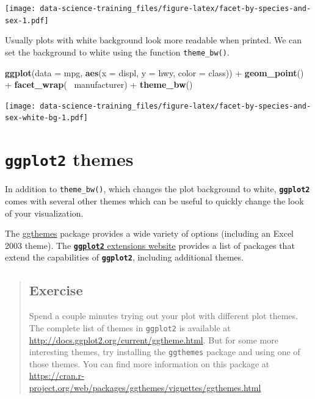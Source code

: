 \documentclass[]{book}
\newenvironment{Shaded}{\begin{snugshade}}{\end{snugshade}}
\newcommand{\KeywordTok}[1]{\textcolor[rgb]{0.13,0.29,0.53}{\textbf{{#1}}}}
\newcommand{\DataTypeTok}[1]{\textcolor[rgb]{0.13,0.29,0.53}{{#1}}}
\newcommand{\StringTok}[1]{\textcolor[rgb]{0.31,0.60,0.02}{{#1}}}
\newcommand{\NormalTok}[1]{{#1}}
\theoremstyle{definition}
\theoremstyle{definition}
\theoremstyle{definition}
\theoremstyle{remark}
\begin{document}
\texttt{[image: data-science-training\_files/figure-latex/facet-by-species-and-sex-1.pdf]}

Usually plots with white background look more readable when printed. We
can set the background to white using the function \texttt{theme\_bw()}.

\begin{Shaded}
\begin{Highlighting}[]
 \KeywordTok{ggplot}\NormalTok{(}\DataTypeTok{data =} \NormalTok{mpg, }\KeywordTok{aes}\NormalTok{(}\DataTypeTok{x =} \NormalTok{displ, }\DataTypeTok{y =} \NormalTok{hwy, }\DataTypeTok{color =} \NormalTok{class)) +}
\StringTok{     }\KeywordTok{geom_point}\NormalTok{() +}
\StringTok{     }\KeywordTok{facet_wrap}\NormalTok{(~}\StringTok{ }\NormalTok{manufacturer) +}
\StringTok{     }\KeywordTok{theme_bw}\NormalTok{()}
\end{Highlighting}
\end{Shaded}

\texttt{[image: data-science-training\_files/figure-latex/facet-by-species-and-sex-white-bg-1.pdf]}

\section{\texorpdfstring{\textbf{\texttt{ggplot2}}
themes}{ggplot2 themes}}\label{ggplot2-themes}

In addition to \texttt{theme\_bw()}, which changes the plot background
to white, \textbf{\texttt{ggplot2}} comes with several other themes
which can be useful to quickly change the look of your visualization.

The
\href{https://cran.r-project.org/web/packages/ggthemes/vignettes/ggthemes.html}{ggthemes}
package provides a wide variety of options (including an Excel 2003
theme). The
\href{https://www.ggplot2-exts.org}{\textbf{\texttt{ggplot2}} extensions
website} provides a list of packages that extend the capabilities of
\textbf{\texttt{ggplot2}}, including additional themes.

\begin{quote}
\subsection{Exercise}\label{exercise-2}

Spend a couple minutes trying out your plot with different plot themes.
The complete list of themes in \texttt{ggplot2} is available at
\url{http://docs.ggplot2.org/current/ggtheme.html}. But for some more
interesting themes, try installing the \texttt{ggthemes} package and
using one of those themes. You can find more information on this package
at
\url{https://cran.r-project.org/web/packages/ggthemes/vignettes/ggthemes.html}
\end{quote}
\end{document}

